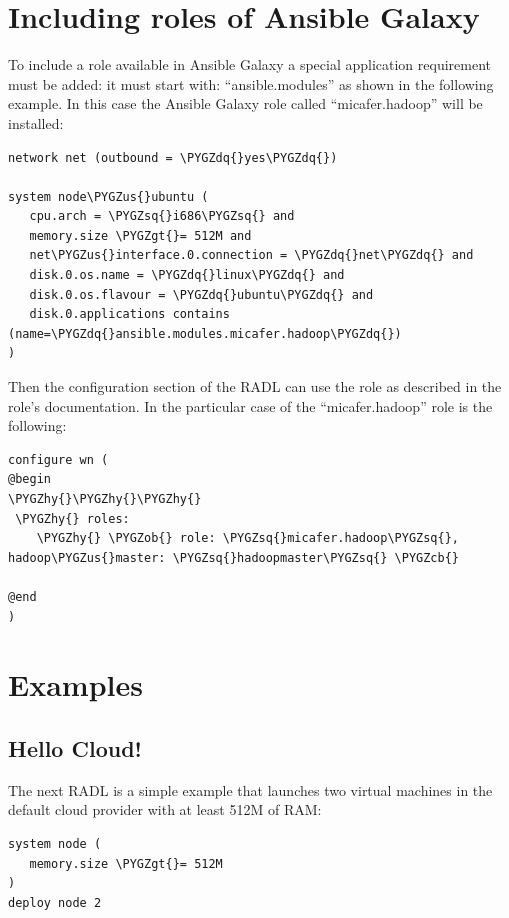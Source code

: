 \documentclass[letterpaper,10pt,english]{sphinxmanual}
\def\PYGZus{\char`\_}
\def\PYGZob{\char`\{}
\def\PYGZcb{\char`\}}
\def\PYGZgt{\char`\>}
\def\PYGZhy{\char`\-}
\def\PYGZsq{\char`\'}
\def\PYGZdq{\char`\"}
\begin{document}
\section{Including roles of Ansible Galaxy}
\label{radl:including-roles-of-ansible-galaxy}
To include a role available in Ansible Galaxy a special application requirement
must be added: it must start with: ``ansible.modules'' as shown in the following
example. In this case the Ansible Galaxy role called ``micafer.hadoop'' will be installed:

\begin{Verbatim}[commandchars=\\\{\}]
network net (outbound = \PYGZdq{}yes\PYGZdq{})

system node\PYGZus{}ubuntu (
   cpu.arch = \PYGZsq{}i686\PYGZsq{} and
   memory.size \PYGZgt{}= 512M and
   net\PYGZus{}interface.0.connection = \PYGZdq{}net\PYGZdq{} and
   disk.0.os.name = \PYGZdq{}linux\PYGZdq{} and
   disk.0.os.flavour = \PYGZdq{}ubuntu\PYGZdq{} and
   disk.0.applications contains (name=\PYGZdq{}ansible.modules.micafer.hadoop\PYGZdq{})
)
\end{Verbatim}

Then the configuration section of the RADL can use the role as described in the role's
documentation. In the particular case of the ``micafer.hadoop'' role is the following:

\begin{Verbatim}[commandchars=\\\{\}]
configure wn (
@begin
\PYGZhy{}\PYGZhy{}\PYGZhy{}
 \PYGZhy{} roles:
    \PYGZhy{} \PYGZob{} role: \PYGZsq{}micafer.hadoop\PYGZsq{}, hadoop\PYGZus{}master: \PYGZsq{}hadoopmaster\PYGZsq{} \PYGZcb{}

@end
)
\end{Verbatim}


\section{Examples}
\label{radl:examples}

\subsection{Hello Cloud!}
\label{radl:hello-cloud}
The next RADL is a simple example that launches two virtual machines in the
default cloud provider with at least 512M of RAM:

\begin{Verbatim}[commandchars=\\\{\}]
system node (
   memory.size \PYGZgt{}= 512M
)
deploy node 2
\end{Verbatim}
\end{document}

